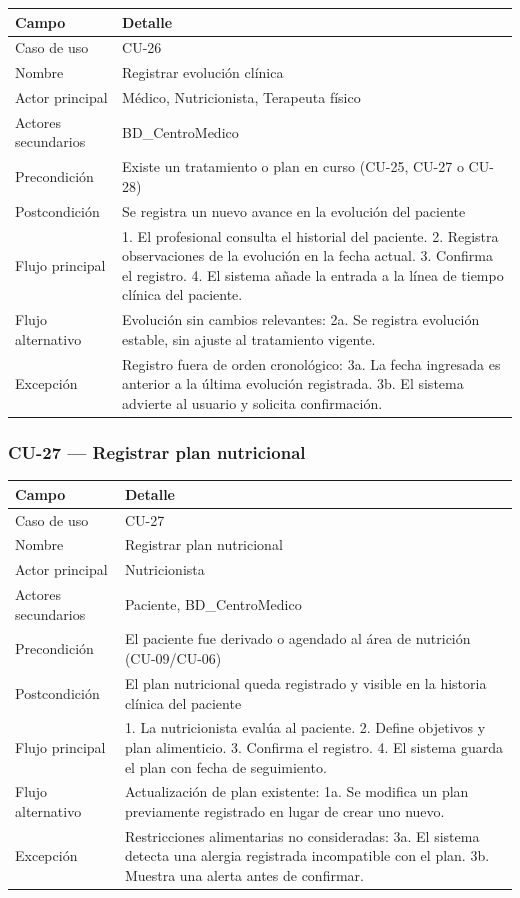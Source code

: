 \documentclass[11pt,a4paper]{article}
\begin{document}
	\begin{longtable}{p{} p{} }
		\toprule
		\textbf{Campo} & \textbf{Detalle} \\
		\midrule
		\endhead
		Caso de uso & CU-26 \\
		Nombre & Registrar evolución clínica \\
		Actor principal & Médico, Nutricionista, Terapeuta físico \\
		Actores secundarios & BD\_CentroMedico \\
		Precondición & Existe un tratamiento o plan en curso (CU-25, CU-27 o CU-28) \\
		Postcondición & Se registra un nuevo avance en la evolución del paciente \\
		Flujo principal & 1. El profesional consulta el historial del paciente. 2. Registra observaciones de la evolución en la fecha actual. 3. Confirma el registro. 4. El sistema añade la entrada a la línea de tiempo clínica del paciente. \\
		Flujo alternativo & Evolución sin cambios relevantes: 2a. Se registra evolución estable, sin ajuste al tratamiento vigente. \\
		Excepción & Registro fuera de orden cronológico: 3a. La fecha ingresada es anterior a la última evolución registrada. 3b. El sistema advierte al usuario y solicita confirmación. \\
		\bottomrule
	\end{longtable}
	
	\subsubsection{CU-27 --- Registrar plan nutricional}
	
	\begin{longtable}{p{} p{} }
		\toprule
		\textbf{Campo} & \textbf{Detalle} \\
		\midrule
		\endhead
		Caso de uso & CU-27 \\
		Nombre & Registrar plan nutricional \\
		Actor principal & Nutricionista \\
		Actores secundarios & Paciente, BD\_CentroMedico \\
		Precondición & El paciente fue derivado o agendado al área de nutrición (CU-09/CU-06) \\
		Postcondición & El plan nutricional queda registrado y visible en la historia clínica del paciente \\
		Flujo principal & 1. La nutricionista evalúa al paciente. 2. Define objetivos y plan alimenticio. 3. Confirma el registro. 4. El sistema guarda el plan con fecha de seguimiento. \\
		Flujo alternativo & Actualización de plan existente: 1a. Se modifica un plan previamente registrado en lugar de crear uno nuevo. \\
		Excepción & Restricciones alimentarias no consideradas: 3a. El sistema detecta una alergia registrada incompatible con el plan. 3b. Muestra una alerta antes de confirmar. \\
		\bottomrule
	\end{longtable}
	
\end{document}
